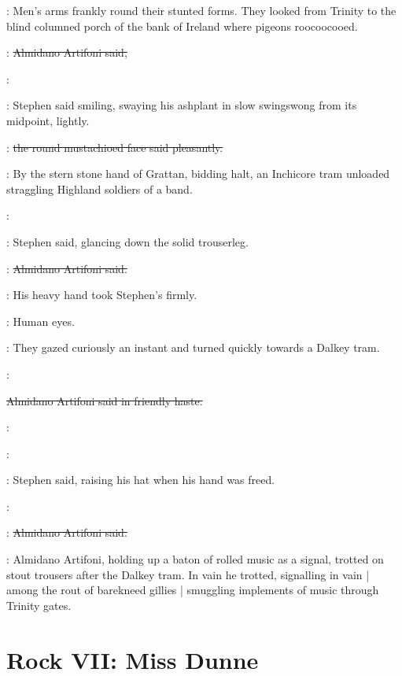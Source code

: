 :
Men's arms frankly round their stunted forms.
They looked from Trinity
to the blind columned porch of the bank of Ireland
where pigeons roocoocooed.

\artifoni:
\sout{Almidano Artifoni said,}

\Stephen:

:
Stephen said smiling,
swaying his ashplant in slow swingswong from its midpoint,
lightly.

\artifoni:
\sout{the round mustachioed face said pleasantly.}%

:
By the stern stone hand of Grattan,
bidding halt,
an Inchicore tram unloaded straggling Highland soldiers of a band.

\Stephen:

:
Stephen said,
glancing down the solid trouserleg.

\artifoni:
\sout{Almidano Artifoni said.}

:
His heavy hand took Stephen's firmly.

\StephenInt:
Human eyes.

:
They gazed curiously an instant
and turned quickly towards a Dalkey tram.

\artifoni:

\sout{Almidano Artifoni said in friendly haste.}

\artifoni:

\Stephen:

:
Stephen said,%
raising his hat when his hand was freed.

\Stephen:

\artifoni:
\sout{Almidano Artifoni said.}

:
Almidano Artifoni,
holding up a baton of rolled music as a signal,
trotted on stout trousers after the Dalkey tram.
In vain he trotted,
signalling in vain |
among the rout of barekneed gillies |
smuggling implements of music through Trinity gates.


\section*{Rock VII: Miss Dunne}


